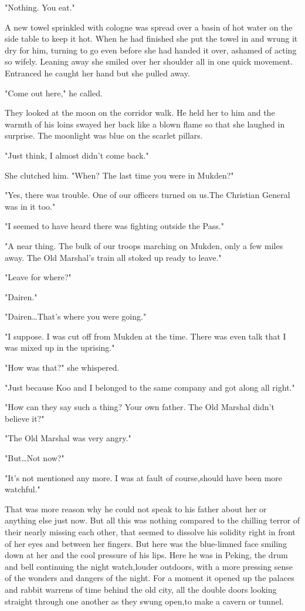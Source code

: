 \par "Nothing. You eat."
\par A new towel sprinkled with cologne was spread over a basin of hot water on the side table to keep it hot. When he had finished she put the towel in and wrung it dry for him, turning to go even before she had handed it over, ashamed of acting so wifely. Leaning away she smiled over her shoulder all in one quick movement. Entranced he caught her hand but she pulled away.
\par "Come out here," he called.
\par They looked at the moon on the corridor walk. He held her to him and the warmth of his loins swayed her back like a blown flame so that she laughed in surprise. The moonlight was blue on the scarlet pillars.
\par "Just think, I almost didn't come back."
\par She clutched him. "When? The last time you were in Mukden?"
\par "Yes, there was trouble. One of our officers turned on us.The Christian General was in it too."
\par "I seemed to have heard there was fighting outside the Pass."
\par "A near thing. The bulk of our troops marching on Mukden, only a few miles away. The Old Marshal's train all stoked up ready to leave."
\par "Leave for where?"
\par "Dairen."
\par "Dairen…That's where you were going."
\par "I suppose. I was cut off from Mukden at the time. There was even talk that I was mixed up in the uprising."
\par "How was that?" she whispered.
\par "Just because Koo and I belonged to the same company and got along all right."
\par "How can they say such a thing? Your own father. The Old Marshal didn't believe it?"
\par "The Old Marshal was very angry."
\par "But…Not now?"
\par "It's not mentioned any more. I was at fault of course,should have been more watchful."
\par That was more reason why he could not speak to his father about her or anything else just now. But all this was nothing compared to the chilling terror of their nearly missing each other, that seemed to dissolve his solidity right in front of her eyes and between her fingers. But here was the blue-limned face smiling down at her and the cool pressure of his lips. Here he was in Peking, the drum and bell continuing the night watch,louder outdoors, with a more pressing sense of the wonders and dangers of the night. For a moment it opened up the palaces and rabbit warrens of time behind the old city, all the double doors looking straight through one another as they swung open,to make a cavern or tunnel.
